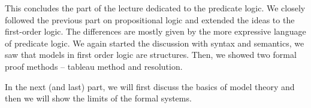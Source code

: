 \bigskip

This concludes the part of the lecture dedicated to the predicate logic. We closely followed the previous part on propositional logic and extended the ideas to the first-order logic. The differences are mostly given by the more expressive language of predicate logic. We again started the discussion with syntax and semantics, we saw that models in first order logic are structures. Then, we showed two formal proof methods -- tableau method and resolution. 

In the next (and last) part, we will first discuss the basics of model theory and then we will show the limits of the formal systems.